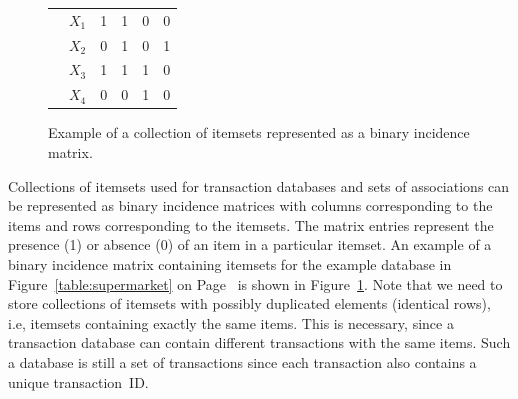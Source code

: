 \documentclass[10pt,a4paper]{article}
\begin{document}
\begin{figure}[tp]
\begin{tabular}{cl|cccc}
& $X_1$ 		& 1 & 1 & 0 &  0 \\
& $X_2$ 	  	& 0 & 1 & 0 &  1 \\
& $X_3$ 		& 1 & 1 & 1 &  0 \\
& $X_4$ 		& 0 & 0 & 1 &  0 \\
\end{tabular}
\caption{Example of a collection of itemsets represented as a 
    binary incidence matrix.\label{fig:itemsetMatrix}}
\end{figure}

Collections of itemsets used for transaction databases and sets of
associations can be represented as binary incidence matrices with
columns corresponding to the items and rows corresponding to the
itemsets.  The matrix entries represent the presence (1) or absence (0)
of an item in a particular itemset.  An example of a binary incidence
matrix containing itemsets for the example database in
Figure~\ref{table:supermarket} on Page~\pageref{table:supermarket} is
shown in Figure~\ref{fig:itemsetMatrix}.  Note that we need to store
collections of itemsets with possibly duplicated elements (identical
rows), i.e, itemsets containing exactly the same items. This is
necessary, since a transaction database can contain different
transactions with the same items. Such a database is still a set of
transactions since each transaction also contains a unique
transaction~ID.
\end{document}
